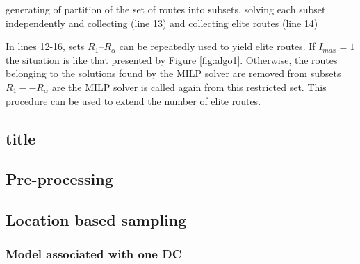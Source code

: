 \documentclass[a4paper,10pt]{article}
\begin{document}
\begin{linenumbers}
 generating of partition of the set of routes into subsets, solving each subset independently and collecting  (line 13) and collecting elite routes (line 14)

In lines 12-16, sets $R_1$--$R_\alpha$ can be repeatedly used to yield elite routes. If $I_{max}=1$ the situation is like that presented by Figure \ref{fig:algo1}. Otherwise, the routes belonging to the solutions found by the MILP solver are removed from subsets $R_1 -- R_\alpha $ are the MILP solver is called again from this restricted set. This procedure can be used to extend the number of elite routes. 


\subsection{title}







\subsection{Pre-processing}



\subsection{Location based sampling}


\subsubsection{Model associated with one DC}


\end{linenumbers}
\end{document}
